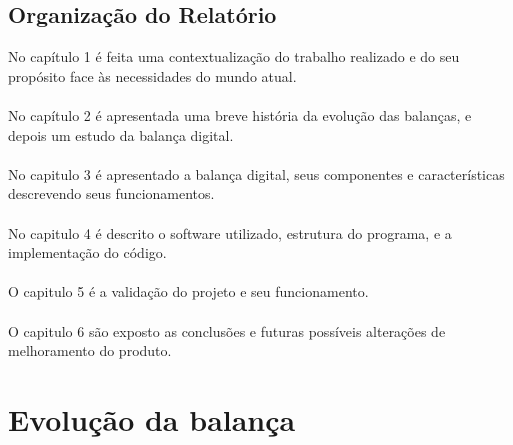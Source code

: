 \section{Organização do Relatório}
No capítulo 1 é feita uma contextualização do trabalho realizado e do seu propósito face às necessidades do mundo atual.
\\
\\
No capítulo 2 é apresentada uma breve história da evolução das balanças, e depois um estudo da balança digital.
\\
\\
No capitulo 3 é apresentado a balança digital, seus componentes e características descrevendo seus funcionamentos.
\\
\\
No capitulo 4 é descrito o software utilizado, estrutura do programa, e a implementação do código.
\\
\\
O capitulo 5 é a validação do projeto  e seu funcionamento.
\\
\\
O capitulo 6 são exposto as conclusões e futuras possíveis alterações de melhoramento do produto.
\chapter{Evolução da balança}
